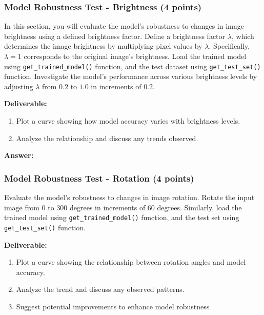\documentclass[11pt, oneside]{article}   	%
\begin{document}
\subsubsection*{Model Robustness Test - Brightness (4 points)}
In this section, you will evaluate the model's robustness to changes in image brightness using a defined brightness factor.
Define a brightness factor $\lambda$, which determines the image brightness by multiplying pixel values by $\lambda$. Specifically, $\lambda = 1$ corresponds to the original image's brightness.
Load the trained model using \texttt{get\_trained\_model()} function, and the test dataset using \texttt{get\_test\_set()} function.  Investigate the model's performance across various brightness levels by adjusting $\lambda$ from $0.2$ to $1.0$ in increments of $0.2$. 

\noindent\textbf{Deliverable:}

\begin{enumerate}
    \item  Plot a curve showing how model accuracy varies with brightness levels.
    \item Analyze the relationship and discuss any trends observed.
\end{enumerate}


\begin{answerbox} \textbf{Answer:} \vspace*{1cm}

\end{answerbox}


\subsubsection*{Model Robustness Test - Rotation (4 points)}

Evaluate the model's robustness to changes in image rotation. Rotate the input image from $0$ to $300$ degrees in increments of $60$ degrees. 
Similarly, load the trained model using \texttt{get\_trained\_model()} function, and the test set using \texttt{get\_test\_set()} function. 

\noindent\textbf{Deliverable:}

\begin{enumerate}
    \item Plot a curve showing the relationship between rotation angles and model accuracy.
    \item Analyze the trend and discuss any observed patterns.
    \item Suggest potential improvements to enhance model robustness
\end{enumerate}
\end{document}
